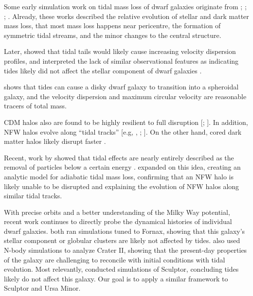 Some early simulation work on tidal mass loss of dwarf galaxies
originate from \citet{oh+lin+aarseth1995}; \citet{piatek+pryor1995};
\citet{moore+davis1994}; \citet{johnston+spergel+hernquist1995}.
Already, these works described the relative evolution of stellar and
dark matter mass loss, that most mass loss happens near pericentre, the
formation of symmetric tidal streams, and the minor changes to the
central structure.

Later, \citet{read+2006} showed that tidal tails would likely cause
increasing velocity dispersion profiles, and interpreted the lack of
similar observational features as indicating tides likely did not affect
the stellar component of dwarf galaxies \citep[see
also][]{klimentowski+2009a}.

\citet{hayashi+2003}

\citet{klimentowski+2009} shows that tides can cause a disky dwarf
galaxy to transition into a spheroidal galaxy, and the velocity
dispersion and maximum circular velocity are reasonable tracers of total
mass.

CDM halos also are found to be highly resilient to full disruption
{[}\citet{EP2020}; {]}. In addition, NFW halos evolve along ``tidal
tracks'' {[}e.g, \citet{PNM2008}, \citet{EN2021}; {]}. On the other
hand, cored dark matter halos likely disrupt faster
\citep[e.g.,][]{penarrubia+2010, errani+2023a}.

\citet{green+vandenbosch2019}

Recent, work by
\citet{drakos+taylor+benson2020, drakos+taylor+benson2022, amorisco2021}
showed that tidal effects are nearly entirely described as the removal
of particles below a certain energy \citep[see
also][]{choi+weinberg+katz2009}. \citet{strucker+2023} expanded on this
idea, creating an analytic model for adiabatic tidal mass loss,
confirming that an NFW halo is likely unable to be disrupted and
explaining the evolution of NFW halos along similar tidal tracks.

With precise orbits and a better understanding of the Milky Way
potential, recent work continues to directly probe the dynamical
histories of individual dwarf galaxies.
\citet{borukhovetskaya+2022, dicintio+2024} both ran simulations tuned
to Fornax, showing that this galaxy's stellar component or globular
clusters are likely not affected by tides. \citet{borukhovetskaya+2022a}
also used N-body simulations to analyze Crater II, showing that the
present-day properties of the galaxy are challenging to reconcile with
\LCDM{} initial conditions with tidal evolution. Most relevantly,
\citet{iorio+2019} conducted simulations of Sculptor, concluding tides
likely do not affect this galaxy. Our goal is to apply a similar
framework to Sculptor and Ursa Minor.

